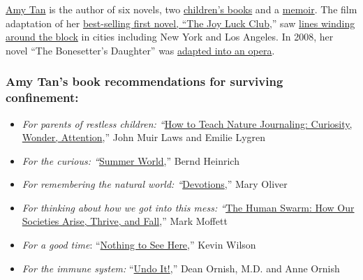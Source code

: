 \href{http://www.amytan.net/}{Amy Tan} is the author of six novels, two
\href{https://www.nytimes.com/1992/11/08/books/childrens-books-girl-overboard.html}{children's
books} and a
\href{https://www.nytimes.com/2017/10/16/books/amy-tan-memoir.html}{memoir}.
The film adaptation of her
\href{https://www.nytimes.com/1989/03/19/books/the-joy-luck-club.html?searchResultPosition=2}{best-selling
first novel, ``The Joy Luck Club},'' saw
\href{https://www.nytimes.com/2018/09/09/movies/joy-luck-club-crazy-rich-asians.html?searchResultPosition=3}{lines
winding around the block} in cities including New York and Los Angeles.
In 2008, her novel ``The Bonesetter's Daughter'' was
\href{https://www.nytimes.com/2008/08/31/arts/music/31melv.html}{adapted
into an opera}.

\hypertarget{amy-tans-book-recommendations-for-surviving-confinement}{%
\subsubsection{\texorpdfstring{\textbf{Amy Tan's book recommendations
for surviving
confinement:}}{Amy Tan's book recommendations for surviving confinement:}}\label{amy-tans-book-recommendations-for-surviving-confinement}}

\begin{itemize}
\tightlist
\item
  \emph{For parents of restless children:
  ``}\href{https://heydaybooks.com/book/how-to-teach-nature-journaling/}{How
  to Teach Nature Journaling: Curiosity, Wonder, Attention},'' John Muir
  Laws and Emilie Lygren
\end{itemize}

\begin{itemize}
\item
  \emph{For the curious:
  ``}\href{https://www.nytimes.com/2009/05/31/books/review/Royte-t.html}{Summer
  World},'' Bernd Heinrich
\item
  \emph{For remembering the natural world:
  ``}\href{https://www.penguinrandomhouse.com/books/536247/devotions-by-mary-oliver/}{Devotions},''
  Mary Oliver
\item
  \emph{For thinking about how we got into this mess:
  ``}\href{https://www.basicbooks.com/titles/mark-w-moffett/the-human-swarm/9781541617292/}{The
  Human Swarm: How Our Societies Arise, Thrive, and Fall},'' Mark
  Moffett
\item
  \emph{For a good time}:
  ``\href{https://www.harpercollins.com/9780062913463/nothing-to-see-here/}{Nothing
  to See Here},'' Kevin Wilson
\item
  \emph{For the immune system:}
  ``\href{https://www.penguinrandomhouse.com/books/572963/undo-it-by-dean-ornish-md-and-anne-ornish/}{Undo
  It!},'' Dean Ornish, M.D. and Anne Ornish
\end{itemize}

